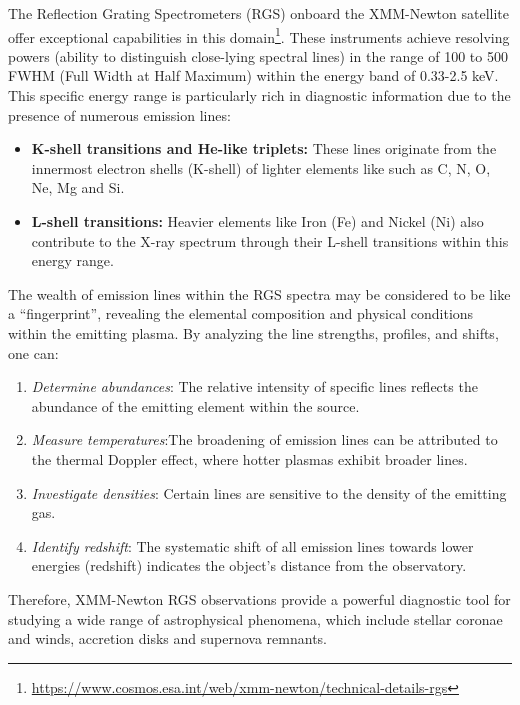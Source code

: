 		The Reflection Grating Spectrometers (RGS) onboard the XMM-Newton satellite offer exceptional capabilities in this domain\footnote{\url{https://www.cosmos.esa.int/web/xmm-newton/technical-details-rgs}}. These instruments achieve resolving powers (ability to distinguish close-lying spectral lines) in the range of 100 to 500 FWHM (Full Width at Half Maximum) within the energy band of 0.33-2.5 keV. This specific energy range is particularly rich in diagnostic information due to the presence of numerous emission lines:
		\begin{itemize}
			\item \textbf{K-shell transitions and He-like triplets:} These lines originate from the innermost electron shells (K-shell) of lighter elements like such as C, N, O, Ne, Mg and Si.
			
			\item \textbf{L-shell transitions:} Heavier elements like Iron (Fe) and Nickel (Ni) also contribute to the X-ray spectrum through their L-shell transitions within this energy range.
		\end{itemize}
		
		The wealth of emission lines within the RGS spectra may be considered to be like a ``fingerprint'',  revealing the elemental composition and physical conditions within the emitting plasma. By analyzing the line strengths, profiles, and shifts, one can:
		\begin{enumerate}
			\item \textit{Determine abundances}: The relative intensity of specific lines reflects the abundance of the emitting element within the source.
			
			\item \textit{Measure temperatures}:The broadening of emission lines can be attributed to the thermal Doppler effect,
where hotter plasmas exhibit broader lines.
			
			\item \textit{Investigate densities}: Certain lines are sensitive to the density of the emitting gas.
			
			\item \textit{Identify redshift}: The systematic shift of all emission lines towards lower energies (redshift) indicates the object's distance from the observatory.
		\end{enumerate}
		
		Therefore, XMM-Newton RGS observations provide a powerful diagnostic tool for studying a wide range of astrophysical phenomena, which include stellar coronae and winds, accretion disks and supernova remnants.
		
